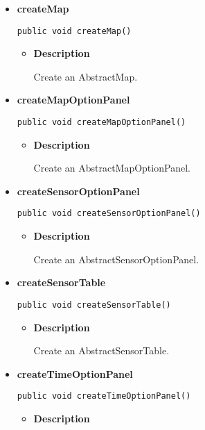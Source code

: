 {{{{{{{{{{{{{{\begin{itemize}
{\begin{itemize}
{Create an AbstractGraphOptionPanel.
}
\end{itemize}
}%
\item{ 
\hypertarget{View.AbstractViewFactory.createMap()}{{\bf  createMap}\\}
\begin{lstlisting}[frame=none]
public void createMap()\end{lstlisting} %
\begin{itemize}
\item{
{\bf  Description}

Create an AbstractMap.
}
\end{itemize}
}%
\item{ 
\hypertarget{View.AbstractViewFactory.createMapOptionPanel()}{{\bf  createMapOptionPanel}\\}
\begin{lstlisting}[frame=none]
public void createMapOptionPanel()\end{lstlisting} %
\begin{itemize}
\item{
{\bf  Description}

Create an AbstractMapOptionPanel.
}
\end{itemize}
}%
\item{ 
\hypertarget{View.AbstractViewFactory.createSensorOptionPanel()}{{\bf  createSensorOptionPanel}\\}
\begin{lstlisting}[frame=none]
public void createSensorOptionPanel()\end{lstlisting} %
\begin{itemize}
\item{
{\bf  Description}

Create an AbstractSensorOptionPanel.
}
\end{itemize}
}%
\item{ 
\hypertarget{View.AbstractViewFactory.createSensorTable()}{{\bf  createSensorTable}\\}
\begin{lstlisting}[frame=none]
public void createSensorTable()\end{lstlisting} %
\begin{itemize}
\item{
{\bf  Description}

Create an AbstractSensorTable.
}
\end{itemize}
}%
\item{ 
\hypertarget{View.AbstractViewFactory.createTimeOptionPanel()}{{\bf  createTimeOptionPanel}\\}
\begin{lstlisting}[frame=none]
public void createTimeOptionPanel()\end{lstlisting} %
\begin{itemize}
\item{
{\bf  Description}

}
\end{itemize}}
\end{itemize}}}}}}}}}}}}}}}
